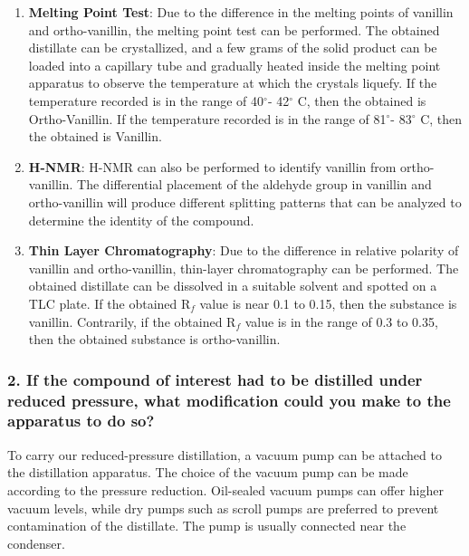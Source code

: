 \documentclass[letterpaper,12pt]{article}
\begin{document}
\begin{enumerate}
    \item \textbf{Melting Point Test}: Due to the difference in the melting points of vanillin and ortho-vanillin, the melting point test can be performed. The obtained distillate can be crystallized, and a few grams of the solid product can be loaded into a capillary tube and gradually heated inside the melting point apparatus to observe the temperature at which the crystals liquefy. If the temperature recorded is in the range of 40$^{\circ}$- 42$^{\circ}$ C, then the obtained is Ortho-Vanillin. If the temperature recorded is in the range of 81$^{\circ}$- 83$^{\circ}$ C, then the obtained is Vanillin.
    \item \textbf{H-NMR}: H-NMR can also be performed to identify vanillin from ortho-vanillin. The differential placement of the aldehyde group in vanillin and ortho-vanillin will produce different splitting patterns that can be analyzed to determine the identity of the compound.
    \item \textbf{Thin Layer Chromatography}: Due to the difference in relative polarity of vanillin and ortho-vanillin, thin-layer chromatography can be performed. The obtained distillate can be dissolved in a suitable solvent and spotted on a TLC plate. If the obtained R$_f$ value is near 0.1 to 0.15, then the substance is vanillin. Contrarily, if the obtained R$_f$ value is in the range of 0.3 to 0.35, then the obtained substance is ortho-vanillin.

\end{enumerate}

\subsubsection*{2. If the compound of interest had to be distilled under reduced pressure, what modification could you make to the apparatus to do so?
}

To carry our reduced-pressure distillation, a vacuum pump can be attached to the distillation apparatus. The choice of the vacuum pump can be made according to the pressure reduction. Oil-sealed vacuum pumps can offer higher vacuum levels, while dry pumps such as scroll pumps are preferred to prevent contamination of the distillate. The pump is usually connected near the condenser.
\end{document}
